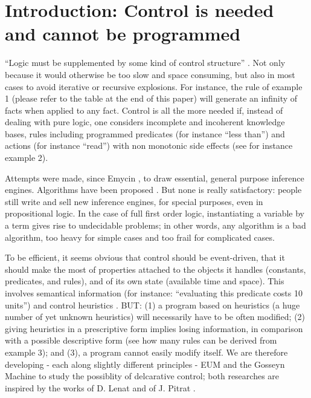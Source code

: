 \documentclass[11pt,a4paper,svgnames]{article}
\begin{document}
  \section{Introduction: Control is needed and cannot be programmed}
  \label{sec:intro}

  ``Logic must be supplemented by some kind of control structure''
  \cite{Simon-Search-1983}. Not only because it would otherwise be too slow and
  space consuming, but also in most cases to avoid iterative or recursive
  explosions. For instance, the rule of example 1 (please refer to the table at
  the end of this paper) will generate an infinity of facts when applied to any
  fact. Control is all the more needed if, instead of dealing with pure logic,
  one considers incomplete and incoherent knowledge bases, rules including
  programmed predicates (for instance ``less than'') and actions (for instance
  ``read'') with non monotonic side effects (see for instance example 2).

  Attempts were made, since Emycin \cite{VanMelle-Emycin-1980}, to draw
  essential, general purpose inference engines. Algorithms have been proposed
  \cite{Forgy-Rete-1982}. But none is really satisfactory: people still write
  and sell new inference engines, for special  purposes, even in propositional
  logic. In the case of full first order logic, instantiating a variable by a
  term gives rise to undecidable problems; in other words, any algorithm is a
  bad algorithm, too heavy for simple cases and too frail for complicated cases.

  To be efficient, it seems obvious that control should be event-driven, that it
  should make the most of properties attached to the objects it handles
  (constants, predicates, and rules), and of its own state (available time and
  space). This involves semantical information (for instance: ``evaluating this
  predicate costs 10 units'') and control heuristics \cite{Lenat-Heuristics-1982}.
  BUT: (1) a program based on heuristics (a huge
  number of yet unknown heuristics) will necessarily have to be often modified;
  (2) giving heuristics in a prescriptive form implies losing information, in
  comparison with a possible descriptive form (see how many rules can be derived
  from example 3); and (3), a program cannot easily modify itself. We are
  therefore developing - each along slightly different principles -
  EUM \cite{Starynkevitch-EUM-1986} and the Gosseyn
  Machine \cite{Fouet-CompRules-1987} to study the possiblity of delcarative
  control; both researches are inspired by the works of D. Lenat and of J.
  Pitrat \cite{Pitrat-Maciste-1985}.
\end{document}
